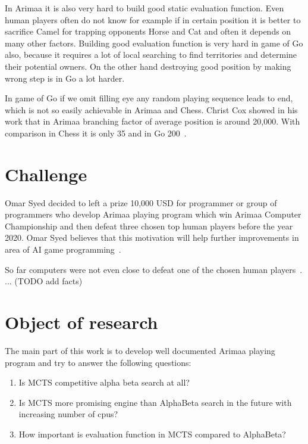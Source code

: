 In Arimaa it is also very hard to build good static evaluation function. Even
human players often do not know for example if in certain position it is better
to sacrifice Camel for trapping opponents Horse and Cat and often it depends on
many other factors. Building good evaluation function is very hard in game of
Go also, because it requires a lot of local searching to find territories and
determine their potential owners. On the other hand destroying good position by
making wrong step is in Go a lot harder.

In game of Go if we omit filling eye any random playing sequence leads to end,
which is not so easily achievable in Arimaa and Chess. Christ Cox showed in his
work that in Arimaa branching factor of average position is around 20,000. With
comparison in Chess it is only 35 and in Go 200~\cite{COX}.


\section{Challenge}
Omar Syed decided to left a prize 10,000 USD for programmer or group of
programmers who develop Arimaa playing program which win Arimaa Computer
Championship and then defeat three chosen top human players before the year
2020. Omar Syed believes that this motivation will help further improvements in
area of AI game programming~\cite{syed}.

So far computers were not even close to defeat one of the chosen human
players~\cite{arimaa.com}. ... (TODO add facts)

\section{Object of research}
The main part of this work is to develop well documented Arimaa playing program
and try to answer the following questions:

\begin{enumerate}
\item Is MCTS competitive alpha beta search at all?
\item Is MCTS more promising engine than AlphaBeta search in the future with
      increasing number of cpus?
\item How important is evaluation function in MCTS compared to AlphaBeta?
\end{enumerate}
